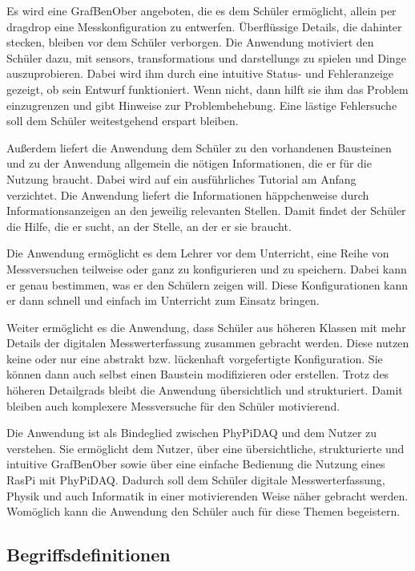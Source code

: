 \documentclass[parskip=full]{scrartcl}
\begin{document}
Es wird eine \gls{GrafBenOber} angeboten, die es dem Schüler ermöglicht, allein per \gls{dragdrop} eine Messkonfiguration zu entwerfen. 
Überflüssige Details, die dahinter stecken, bleiben vor dem Schüler verborgen.
Die Anwendung motiviert den Schüler dazu, mit \glspl{sensor}, \glspl{transformation} und \glspl{darstellung} zu spielen und Dinge auszuprobieren. 
Dabei wird ihm durch eine intuitive Status- und Fehleranzeige gezeigt, ob sein Entwurf funktioniert. 
Wenn nicht, dann hilft sie ihm das Problem einzugrenzen und gibt Hinweise zur Problembehebung. 
Eine lästige Fehlersuche soll dem Schüler weitestgehend erspart bleiben. 

Außerdem liefert die Anwendung dem Schüler zu den vorhandenen Bausteinen und zu der Anwendung allgemein die nötigen Informationen, die er für die Nutzung braucht. Dabei wird auf ein ausführliches Tutorial am Anfang verzichtet. Die Anwendung liefert die Informationen häppchenweise durch Informationsanzeigen an den jeweilig relevanten Stellen. Damit findet der Schüler die Hilfe, die er sucht, an der Stelle, an der er sie braucht.

Die Anwendung ermöglicht es dem Lehrer vor dem Unterricht, eine Reihe von Messversuchen teilweise oder ganz zu konfigurieren und zu speichern. Dabei kann er genau bestimmen, was er den Schülern zeigen will. Diese Konfigurationen kann er dann schnell und einfach im Unterricht zum Einsatz bringen. 

Weiter ermöglicht es die Anwendung, dass Schüler aus höheren Klassen mit mehr Details der digitalen Messwerterfassung zusammen gebracht werden. Diese nutzen keine oder nur eine abstrakt bzw. lückenhaft vorgefertigte Konfiguration. Sie können dann auch selbst einen Baustein modifizieren oder erstellen. Trotz des höheren Detailgrads bleibt die Anwendung übersichtlich und strukturiert. Damit bleiben auch komplexere Messversuche für den Schüler motivierend. 

Die Anwendung ist als Bindeglied zwischen \gls{PhyPiDAQ} und dem Nutzer zu verstehen. Sie ermöglicht dem Nutzer, über eine übersichtliche, strukturierte und intuitive \gls{GrafBenOber} sowie über eine einfache Bedienung die Nutzung eines \gls{RasPi} mit \gls{PhyPiDAQ}. Dadurch soll dem Schüler digitale Messwerterfassung, Physik und auch Informatik in einer motivierenden Weise näher gebracht werden. Womöglich kann die Anwendung den Schüler auch für diese Themen begeistern.  

\subsection{Begriffsdefinitionen}
\end{document}
